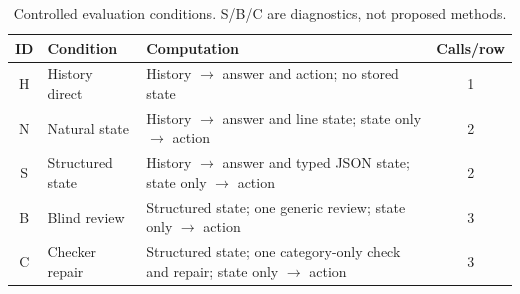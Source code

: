 \documentclass[11pt]{article}
\begin{document}
\begin{table}[h]
\centering
\caption{Controlled evaluation conditions. S/B/C are diagnostics, not proposed methods.}
\label{tab:conditions}
\small
\begin{tabularx}{\linewidth}{@{}c l Y c@{}}
\toprule
ID & Condition & Computation & Calls/row \\
\midrule
H & History direct & History \(\rightarrow\) answer and action; no stored state & 1 \\
N & Natural state & History \(\rightarrow\) answer and line state; state only \(\rightarrow\) action & 2 \\
S & Structured state & History \(\rightarrow\) answer and typed JSON state; state only \(\rightarrow\) action & 2 \\
B & Blind review & Structured state; one generic review; state only \(\rightarrow\) action & 3 \\
C & Checker repair & Structured state; one category-only check and repair; state only \(\rightarrow\) action & 3 \\
\bottomrule
\end{tabularx}
\end{table}
\end{document}
